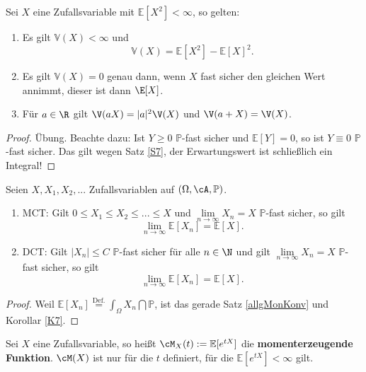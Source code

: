 \begin{korollar}\label{vari}
	Sei $X$ eine Zufallsvariable mit $ \mathbb{E}[X^2] < \infty$, so gelten:
	\begin{enumerate}[label=(\roman*)]
		\item Es gilt $ \mathbb{V}(X) < \infty$ und \[ \mathbb{V}(X) = \mathbb{E}[X^2] - \mathbb{E}[X]^2. \]
		\item	Es gilt $ \mathbb{V}(X) = 0$ genau dann, wenn $X$ fast sicher den gleichen Wert annimmt, dieser ist dann $\E[X]$.
		\item F\"ur $a\in \R$ gilt $\V(aX)=|a|^2 \V(X)$ und $\V(a+X)=\V(X)$.	
\end{enumerate}
\end{korollar}

\begin{proof}
	Übung. Beachte dazu: Ist $Y \geq 0$ $\mathbb{P}$-fast sicher und $ \mathbb{E}[Y] = 0$, so ist $ Y \equiv 0$ $\mathbb P$-fast sicher. Das gilt wegen Satz \ref{S7}, der Erwartungswert ist schlie\ss lich ein Integral!
\end{proof}

\begin{satz}
	Seien $X,X_1,X_2,...$ Zufallsvariablen auf $(\Omega, \cA, \mathbb{P})$.
	\begin{enumerate}[label=(\roman*)]
		\item MCT: Gilt $0 \leq X_1\leq X_2\leq ...\leq X$ und $ \lim\limits_{n \to \infty} X_n = X$ $\mathbb{P}$-fast sicher, so gilt 
		\[ \lim\limits_{n \to \infty} \mathbb{E}[X_n] = \mathbb{E}[X]. \]
		\item DCT: Gilt $|X_n| \leq C$ $\mathbb{P}$-fast sicher für alle $n \in \N$ und gilt $ \lim\limits_{n \to \infty} X_n = X$ $\mathbb{P}$-fast sicher, so gilt
		\[ \lim\limits_{n \to \infty} \mathbb{E}[X_n] = \mathbb{E}[X]. \]
	\end{enumerate}
\end{satz}

\begin{proof}
	Weil $\mathbb{E}[X_n] \overset{\text{Def.}}{=} \int_{\Omega} X_n \dint \mathbb{P}$, ist das gerade Satz \ref{allgMonKonv} und Korollar \ref{K7}. 
\end{proof}

\begin{deff}
	Sei $X$ eine Zufallsvariable, so heißt $\cM_X(t) := \mathbb{E}[e^{tX}]$ die \textbf{momenterzeugende Funktion}. $\cM(X)$ ist nur für die $t$ definiert, für die $\mathbb{E}[e^{tX}] < \infty$ gilt.
\end{deff}

